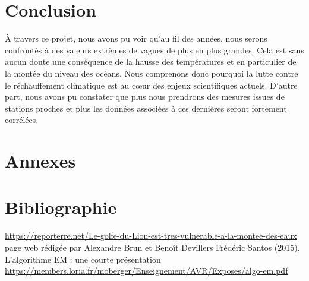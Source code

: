 \documentclass[a4paper,french,10pt]{article}
\begin{document}



\newpage

\section{Conclusion}
À travers ce projet, nous avons pu voir qu'au fil des années, nous serons confrontés à des valeurs extrêmes de vagues de plus en plus grandes. Cela est sans aucun doute une conséquence de la hausse des températures et en particulier de la montée du niveau des océans. Nous comprenons donc pourquoi la lutte contre le réchauffement climatique est au cœur des enjeux scientifiques actuels. D'autre part, nous avons pu constater que plus nous prendrons des mesures issues de stations proches et plus les données associées à ces dernières seront fortement corrélées. 


\newpage

\section{Annexes}
%

\newpage

\section{Bibliographie}

\renewcommand\refname{}
\begin{thebibliography}{9}
	\url{https://reporterre.net/Le-golfe-du-Lion-est-tres-vulnerable-a-la-montee-des-eaux}
	page web rédigée par Alexandre Brun et Benoît Devillers
	Frédéric Santos (2015). L'algorithme EM : une courte présentation
	\url{https://members.loria.fr/moberger/Enseignement/AVR/Exposes/algo-em.pdf}
\end{thebibliography}
\end{document}
